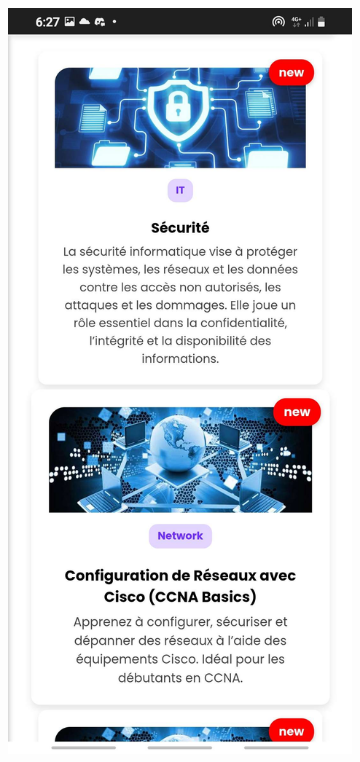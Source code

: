 \documentclass{article}
\begin{document}
\begin{figure}[H]
  \centering
  \begin{subfigure}[t]{0.4\textwidth}
    \centering
    \includegraphics[width=\textwidth]{courtlphn.jpg}

\end{subfigure}
\end{figure}
\end{document}
